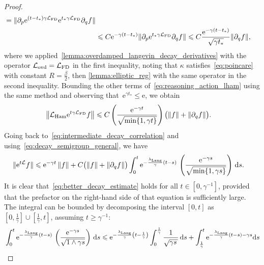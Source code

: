 \documentclass[11pt,a4paper]{article}
\newcommand{\e}{\mathrm{e}}
\renewcommand{\d}{\mathrm d}
\theoremstyle{plain}
\numberwithin{equation}{section}
\renewcommand{\leq}{\leqslant}
\renewcommand{\geq}{\geqslant}
\begin{document}
\begin{proof}
\begin{align*}
        = \norm*{\partial_p \e^{(t - t_*) \gamma \mathcal L_{\rm FD}} \e^{t_* \gamma \mathcal L_{\rm FD}} \partial_q f} \\
        &\leq C \e^{- \gamma (t - t_*)} \norm*{\partial_p \e^{t_* \gamma \mathcal L_{\rm FD}} \partial_q f}
        \leq C \frac{\e^{- \gamma (t - t_*)}}{\sqrt{\gamma t_*}} \norm*{\partial_q f},
    \end{align*}
    where we applied~\cref{lemma:overdamped_langevin_decay_derivatives} with the operator $\mathcal L_{\rm ovd} = \mathcal L_{\rm FD}$ in the first inequality,
    noting that $\kappa$ satisfies~\eqref{eq:poincare} with constant $R = \frac{\beta}{2}$,
    then \cref{lemma:elliptic_reg} with the same operator in the second inequality.
    Bounding the other terms of~\eqref{eq:reasoning_action_lham} using the same method
    and observing that~$\e^{\gamma t_*} \leq \e$,
    we obtain
    \begin{align}
        \label{eq:bound_action_lham}
        \norm{\mathcal L_{\rm Ham} \e^{t \gamma \mathcal L_{\rm FD}} f}
        &\leq C \left( \frac{\e^{-\gamma t}}{\sqrt{\min\{1, \gamma t\}}} \right) \bigl( \norm{f} + \norm{\partial_q f} \bigr).
    \end{align}
    Going back to~\eqref{eq:intermediate_decay_correlation} and using~\eqref{eq:decay_semigroup_general},
    we have
    \begin{align*}
        \norm*{ \e^{t \mathcal L} f}
        &\leq  \e^{-\gamma t} \norm{f}
        + C  \bigl( \norm{f} + \norm{\partial_q f}\bigr) \int_{0}^{t} \e^{-\frac{\lambda_{\rm Lang}}{\gamma}(t-s)}  \, \left(\frac{\e^{-\gamma s}}{\sqrt{\min\{1, \gamma s\}}}\right) \, \d s.
    \end{align*}
    It is clear that~\eqref{eq:better_decay_estimate} holds for all $t \in [0, \gamma^{-1}]$,
    provided that the prefactor on the right-hand side of that equation is sufficiently large.
    The integral can be bounded by decomposing the interval $[0, t]$ as $[0, \frac{1}{\gamma}] \cup [\frac{1}{\gamma}, t]$,
    assuming $t \geq \gamma^{-1}$:
    \begin{align}
        \notag
        &\int_{0}^{t} \e^{-\frac{\lambda_{\rm Lang}}{\gamma}(t-s)}  \, \left( \frac{\e^{-\gamma s}}{\sqrt{1 \wedge \gamma s}} \right) \, \d s
        \leq
        \e^{-\frac{\lambda_{\rm Lang}}{\gamma} \left(t-\frac{1}{\gamma}\right)}
         \int_{0}^{\frac{1}{\gamma}}  \frac{1}{\sqrt{\gamma s\, }} \, \d s
         + \int_{\frac{1}{\gamma}}^{t} \e^{-\frac{\lambda_{\rm Lang}}{\gamma}(t-s) - \gamma s} \d s \\

\end{align}
\end{proof}
\end{document}
